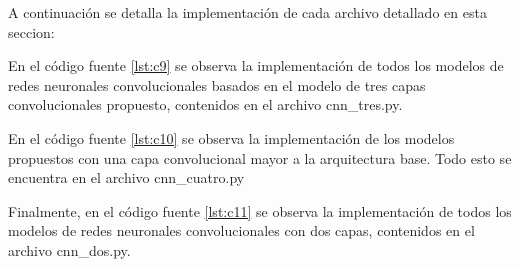 A continuación se detalla la implementación de cada archivo detallado en esta seccion:

En el código fuente \ref{lst:c9} se observa la implementación de todos los modelos de redes neuronales convolucionales basados en el modelo de tres capas convolucionales propuesto, contenidos en el archivo cnn\_tres.py.



En el código fuente \ref{lst:c10} se observa la implementación de los modelos propuestos con una capa convolucional mayor a la arquitectura base. Todo esto se encuentra en el archivo cnn\_cuatro.py



Finalmente, en el código fuente \ref{lst:c11} se observa la implementación de todos los modelos de redes neuronales convolucionales con dos capas, contenidos en el archivo cnn\_dos.py.




